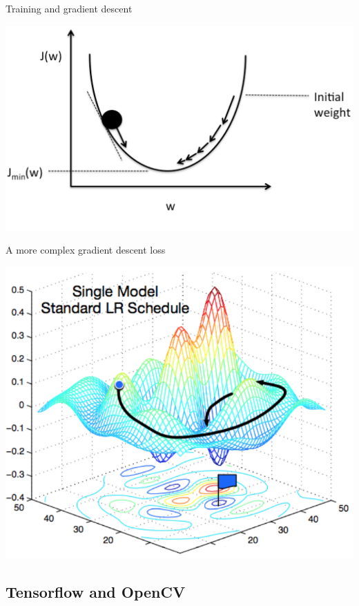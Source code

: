 \documentclass{beamer}
\begin{document}
\begin{frame}{Training and gradient descent}
	\begin{center}
    		\includegraphics[scale=0.4]{grad}
	\end{center}
\end{frame}

\begin{frame}{A more complex gradient descent loss}
	\begin{center}
    		\includegraphics[scale=1.3]{suchcomp}
	\end{center}
\end{frame}

\subsection{Tensorflow and OpenCV}
\end{document}
